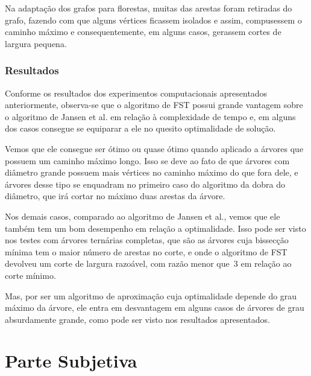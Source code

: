 \documentclass[a4paper,12pt]{article}
\begin{document}
	Na adaptação dos grafos para florestas, muitas das arestas foram retiradas do grafo,
	fazendo com que alguns vértices ficassem isolados e assim, compusessem o caminho máximo 
	e consequentemente, em alguns casos, gerassem cortes de largura pequena.



	\bigskip
	\bigskip
	\bigskip


\section {Resultados}
Conforme os resultados dos experimentos computacionais
 apresentados anteriormente, observa-se
que o algoritmo de FST possui grande vantagem sobre o algoritmo
de Jansen et al. em relação à complexidade de tempo e, em alguns 
dos casos consegue se equiparar a ele no quesito optimalidade de
solução.

Vemos que ele consegue ser ótimo ou quase ótimo quando aplicado
a árvores que possuem um caminho máximo longo. 
Isso se deve ao
fato de que árvores com diâmetro grande possuem 
mais vértices no caminho máximo do que fora dele, e
árvores desse tipo se enquadram no primeiro caso do algoritmo da 
dobra do diâmetro, que irá cortar no máximo duas arestas da árvore.

Nos demais casos, comparado ao algoritmo de Jansen et al.,
vemos que ele também tem um bom desempenho em relação a 
optimalidade. 
Isso pode ser visto nos testes com árvores ternárias 
completas,
que são as árvores cuja bissecção mínima
tem o maior número de arestas no corte, e onde o algoritmo
de FST devolveu um corte de largura razoável, com razão
menor que~3 em relação ao corte mínimo.

Mas, por ser um algoritmo de aproximação cuja optimalidade
depende do grau máximo da árvore, ele entra em desvantagem 
em alguns casos de árvores de grau absurdamente grande,
como pode ser visto nos resultados
apresentados.



\newpage



\newpage

\part{Parte Subjetiva}
\newpage
\end{document}
